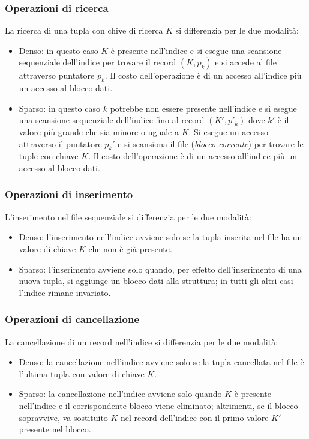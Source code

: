 \documentclass[oneside,a4paper,11pt]{book}
\theoremstyle{italicstyle}
\theoremstyle{normStyle}
\begin{document}
\subsubsection{Operazioni di ricerca}
La ricerca di una tupla con chive di ricerca $K$ si differenzia per le due 
modalità:
\begin{itemize}
    \item Denso: in questo caso $K$ è presente nell'indice e si esegue una scansione 
    sequenziale dell'indice per trovare il record $(K, p_k)$ e si accede al file 
    attraverso puntatore $p_k$. Il costo dell'operazione è di un accesso all'indice più 
    un accesso al blocco dati.
    \item Sparso: in questo caso $k$ potrebbe non essere presente nell'indice e si 
    esegue una scansione sequenziale dell'indice fino al record $(K',p'_k)$ dove $k'$ 
    è il valore più grande che sia minore o uguale a $K$. Si esegue un accesso attraverso 
    il puntatore $p_k'$ e si scansiona il file (\textit{blocco corrente}) per trovare 
    le tuple con chiave $K$. Il costo dell'operazione è di un accesso all'indice più 
    un accesso al blocco dati.
\end{itemize}
\subsubsection{Operazioni di inserimento}
L'inserimento nel file sequenziale si differenzia per le due modalità:
\begin{itemize}
    \item Denso: l'inserimento nell'indice avviene solo se la tupla inserita nel file ha
    un valore di chiave $K$ che non è già presente.
    \item Sparso: l'inserimento avviene solo quando, per effetto dell'inserimento di 
    una nuova tupla, si aggiunge un blocco dati alla struttura; in tutti gli altri 
    casi l'indice rimane invariato.
\end{itemize}
\subsubsection{Operazioni di cancellazione}
La cancellazione di un record nell'indice si differenzia per le due modalità:
\begin{itemize}
    \item Denso: la cancellazione nell'indice avviene solo se la tupla cancellata 
    nel file è l'ultima tupla con valore di chiave $K$.
    \item Sparso: la cancellazione nell'indice avviene solo quando $K$ è presente 
    nell'indice e il corrispondente blocco viene eliminato; altrimenti, se il 
    blocco sopravvive, va sostituito $K$ nel record dell'indice con il primo valore 
    $K'$ presente nel blocco.
\end{itemize}
\end{document}
